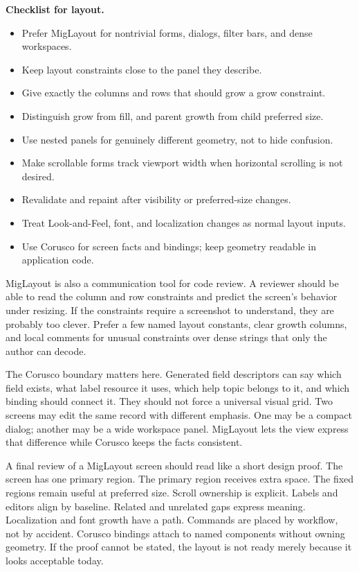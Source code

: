\textbf{Checklist for layout.}
\begin{itemize}
\item Prefer MigLayout for nontrivial forms, dialogs, filter bars, and dense workspaces.
\item Keep layout constraints close to the panel they describe.
\item Give exactly the columns and rows that should grow a grow constraint.
\item Distinguish grow from fill, and parent growth from child preferred size.
\item Use nested panels for genuinely different geometry, not to hide confusion.
\item Make scrollable forms track viewport width when horizontal scrolling is not desired.
\item Revalidate and repaint after visibility or preferred-size changes.
\item Treat Look-and-Feel, font, and localization changes as normal layout inputs.
\item Use Corusco for screen facts and bindings; keep geometry readable in application code.
\end{itemize}

MigLayout is also a communication tool for code review. A reviewer should be
able to read the column and row constraints and predict the screen's behavior
under resizing. If the constraints require a screenshot to understand, they are
probably too clever. Prefer a few named layout constants, clear growth columns,
and local comments for unusual constraints over dense strings that only the
author can decode.

The Corusco boundary matters here. Generated field descriptors can say which
field exists, what label resource it uses, which help topic belongs to it, and
which binding should connect it. They should not force a universal visual grid.
Two screens may edit the same record with different emphasis. One may be a
compact dialog; another may be a wide workspace panel. MigLayout lets the view
express that difference while Corusco keeps the facts consistent.

A final review of a MigLayout screen should read like a short design proof. The
screen has one primary region. The primary region receives extra space. The
fixed regions remain useful at preferred size. Scroll ownership is explicit.
Labels and editors align by baseline. Related and unrelated gaps express
meaning. Localization and font growth have a path. Commands are placed by
workflow, not by accident. Corusco bindings attach to named components without
owning geometry. If the proof cannot be stated, the layout is not ready merely
because it looks acceptable today.

